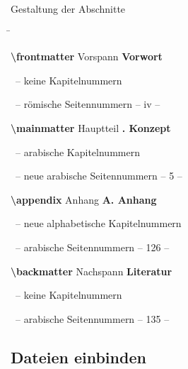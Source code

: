 \begin{frame}[fragile]{Gestaltung der Abschnitte}
  \begin{tabbing}
    \hskip8cm \= \kill

    \textcolor{texcs}{\ttfamily\bfseries\textbackslash frontmatter} Vorspann
        \> \textcolor{examplecolor}{\bfseries\sffamily Vorwort}\\
      \strut\ \textcolor{maincolor}{--} keine Kapitelnummern\\
      \strut\ \textcolor{maincolor}{--} römische Seitennummern
        \> \textcolor{examplecolor}{\rmfamily \qquad -- iv --} \\[3ex]

    \pause

    \textcolor{texcs}{\ttfamily\bfseries\textbackslash mainmatter} Hauptteil
        \> \textcolor{examplecolor}{\bfseries{}. Konzept}\\
      \strut\ \textcolor{maincolor}{--} arabische Kapitelnummern\\
      \strut\ \textcolor{maincolor}{--} \alert{neue} arabische Seitennummern
        \> \textcolor{examplecolor}{\rmfamily \qquad -- 5 --} \\[3ex]

    \pause

    \textcolor{texcs}{\ttfamily\bfseries\textbackslash appendix} Anhang
        \> \textcolor{examplecolor}{\bfseries\sffamily A. Anhang}\\
      \strut\ \textcolor{maincolor}{--} \alert{neue} alphabetische Kapitelnummern\\
      \strut\ \textcolor{maincolor}{--} arabische Seitennummern
        \> \textcolor{examplecolor}{\rmfamily \qquad -- 126 --} \\[3ex]

    \pause

    \textcolor{texcs}{\ttfamily\bfseries\textbackslash backmatter} Nachspann
        \> \textcolor{examplecolor}{\bfseries\sffamily Literatur}\\
      \strut\ \textcolor{maincolor}{--} keine Kapitelnummern\\
      \strut\ \textcolor{maincolor}{--} arabische Seitennummern
        \> \textcolor{examplecolor}{\rmfamily \qquad -- 135 --}
  \end{tabbing}
\end{frame}


\subsection{Dateien einbinden}


